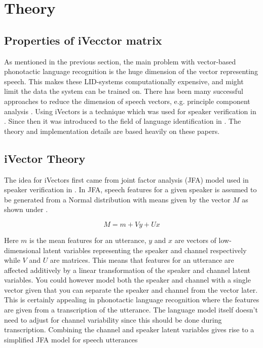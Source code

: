 \chapter{Theory}
\label{sect:Theory}

\section{Properties of iVecctor matrix}





\label{chapterfive}

As mentioned in the previous section, the main problem with vector-based phonotactic language recognition is the huge dimension of the vector representing speech. This makes these LID-systems computationally expensive, and might limit the data the system can be trained on. There has been many successful approaches to reduce the dimension of speech vectors, e.g. principle component analysis \cite{pcaLID}. Using iVectors is a technique which was used for speaker verification in \cite{sviVector}. Since then it was introduced to the field of language identification in \cite{liiVector}. The theory and implementation details are based heavily on these papers.

\section{iVector Theory}
\label{theory}

The idea for iVectors first came from joint factor analysis (JFA) model used in speaker verification in \cite{oldiVector}. In JFA, speech features for a given speaker is assumed to be generated from a Normal distribution with means given by the vector $M$ as shown under \cite{oldiVector}.

\begin{equation}\label{JFA}
M=m+Vy+Ux
\end{equation}

Here $m$ is the mean features for an utterance, $y$ and $x$ are vectors of low-dimensional latent variables representing the speaker and channel respectively while $V$ and $U$ are matrices. This means that features for an utterance are affected additively by a linear transformation of the speaker and channel latent variables. You could however model both the speaker and channel with a single vector given that you can separate the speaker and channel from the vector later. This is certainly appealing in phonotactic language recognition where the features are given from a transcription of the utterance. The language model itself doesn't need to adjust for channel variability since this should be done during transcription. Combining the channel and speaker latent variables gives rise to a simplified JFA model for speech utterances

